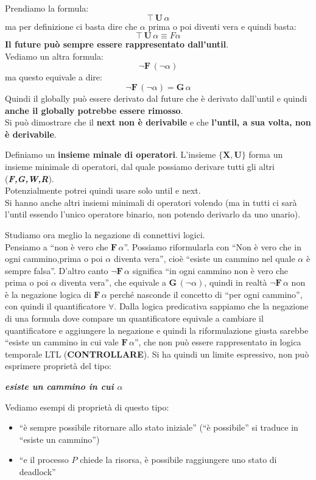 \documentclass[a4paper,12pt, oneside]{book}
\begin{document}
Prendiamo la formula:
\[\top\,\mathbf{U}\,\alpha\]
ma per definizione ci basta dire che $\alpha$ prima o poi diventi vera e
quindi basta:
\[\top\,\mathbf{U}\,\alpha\equiv F\alpha\]
\textbf{Il future può sempre essere rappresentato dall'until}.\\
Vediamo un altra formula:
\[\neg\mathbf{F}\,(\neg\alpha)\]
ma questo equivale a dire:
\[\neg\mathbf{F}\,(\neg\alpha)=\mathbf{G}\,\alpha\]
Quindi il globally può essere derivato dal future che è derivato dall'until e
quindi \textbf{anche il globally potrebbe essere rimosso}.\\
Si può dimostrare che il \textbf{next non è derivabile} e che \textbf{l'until, a
  sua volta, non è derivabile}. 
\begin{definizione}
  Definiamo un \textbf{insieme minale di operatori}. L'insieme
  $\{\mathbf{X},\mathbf{U}\}$ forma un insieme minimale di operatori, dal quale
  possiamo derivare tutti gli altri (\textbf{\textit{F,G,W,R}}).\\
  Potenzialmente potrei quindi usare solo until e next.\\
  Si hanno anche altri insiemi minimali di operatori volendo (ma in tutti ci
  sarà l'until essendo l'unico operatore binario, non potendo derivarlo da uno
  unario). 
\end{definizione}
\noindent
Studiamo ora meglio la negazione di connettivi logici.\\
Pensiamo a ``non è vero che $\mathbf{F}\,\alpha$''. Possiamo riformularla con
``Non è vero che in ogni cammino,prima o poi $\alpha$ diventa vera'', cioè
``esiste un cammino nel quale $\alpha$ è sempre falsa''. D'altro canto
$\neg\mathbf{F}\,\alpha$ significa ``in ogni cammino non è vero che prima o poi
$\alpha$ diventa vera'', che equivale a $\mathbf{G}\,(\neg \alpha)$, quindi in
realtà $\neg\mathbf{F}\,\alpha$ non è la negazione logica di
$\mathbf{F}\,\alpha$ perché nasconde il concetto di ``per ogni cammino'', con
quindi il quantificatore $\forall$. Dalla logica predicativa sappiamo che la
negazione di una formula dove compare un quantificatore equivale a cambiare il
quantificatore e aggiungere la negazione e quindi la riformulazione giusta
sarebbe ``esiste un cammino in cui vale $\mathbf{F}\,\alpha$'', che non può
essere rappresentato in logica temporale LTL (\textbf{CONTROLLARE}). Si ha
quindi un limite 
espressivo, non può esprimere proprietà del tipo:
\begin{center}
  \textbf{\textit{esiste un cammino in cui $\alpha$}}
\end{center}
\begin{esempio}
  Vediamo esempi di proprietà di questo tipo:
  \begin{itemize}
    \item ``è sempre possibile ritornare allo stato iniziale''
    (``è possibile'' si traduce in ``esiste un cammino'')
    \item ``e il processo $P$ chiede la risorsa, è possibile raggiungere uno
    stato di deadlock'' 
  \end{itemize}
\end{esempio}
\end{document}
